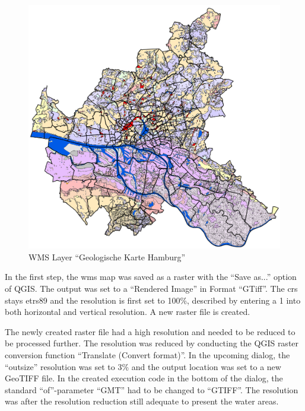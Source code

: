 \documentclass[a4paper, 11pt, oneside]{Thesis}  %
\begin{document}
\begin{figure}[h]
\includegraphics[scale=0.5]{Figures/WMS_Layer_Geologische_Karte.png}
\centering
\caption{WMS Layer ``Geologische Karte Hamburg''}
\label{fig:geologische_karte}
\end{figure}

In the first step, the \ac{wms} map was saved as a raster with the ``Save as...'' option of QGIS. The output was set to a ``Rendered Image'' in Format ``GTiff''. The \ac{crs} stays \ac{etrs89} and the resolution is first set to 100\%, described by entering a 1 into both horizontal and vertical resolution. A new raster file is created.

The newly created raster file had a high resolution and needed to be reduced to be processed further. The resolution was reduced by conducting the QGIS raster conversion function ``Translate (Convert format)''. In the upcoming dialog, the ``outsize'' resolution was set to 3\% and the output location was set to a new GeoTIFF file. In the created execution code in the bottom of the dialog, the standard ``of''-parameter ``GMT'' had to be changed to ``GTIFF''. The resolution was after the resolution reduction still adequate to present the water areas.
\end{document}
